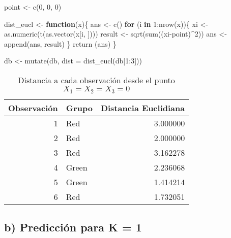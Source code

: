 \documentclass[
  12pt,
  letterpaper,
]{article}
\newenvironment{Shaded}{\begin{snugshade}}{\end{snugshade}}
\newcommand{\AttributeTok}[1]{\textcolor[rgb]{0.77,0.63,0.00}{#1}}
\newcommand{\ControlFlowTok}[1]{\textcolor[rgb]{0.13,0.29,0.53}{\textbf{#1}}}
\newcommand{\DecValTok}[1]{\textcolor[rgb]{0.00,0.00,0.81}{#1}}
\newcommand{\FunctionTok}[1]{\textcolor[rgb]{0.00,0.00,0.00}{#1}}
\newcommand{\NormalTok}[1]{#1}
\newcommand{\OtherTok}[1]{\textcolor[rgb]{0.56,0.35,0.01}{#1}}
\newcommand{\SpecialCharTok}[1]{\textcolor[rgb]{0.00,0.00,0.00}{#1}}
\begin{document}
\begin{Shaded}
\begin{Highlighting}[]
\NormalTok{point }\OtherTok{\textless{}{-}} \FunctionTok{c}\NormalTok{(}\DecValTok{0}\NormalTok{, }\DecValTok{0}\NormalTok{, }\DecValTok{0}\NormalTok{)}

\NormalTok{dist\_eucl }\OtherTok{\textless{}{-}} \ControlFlowTok{function}\NormalTok{(x)\{}
\NormalTok{  ans }\OtherTok{\textless{}{-}} \FunctionTok{c}\NormalTok{()}
  \ControlFlowTok{for}\NormalTok{ (i }\ControlFlowTok{in} \DecValTok{1}\SpecialCharTok{:}\FunctionTok{nrow}\NormalTok{(x))\{}
\NormalTok{    xi }\OtherTok{\textless{}{-}} \FunctionTok{as.numeric}\NormalTok{(}\FunctionTok{t}\NormalTok{(}\FunctionTok{as.vector}\NormalTok{(x[i, ])))}
\NormalTok{    result }\OtherTok{\textless{}{-}} \FunctionTok{sqrt}\NormalTok{(}\FunctionTok{sum}\NormalTok{((xi}\SpecialCharTok{{-}}\NormalTok{point)}\SpecialCharTok{\^{}}\DecValTok{2}\NormalTok{))}
\NormalTok{    ans }\OtherTok{\textless{}{-}} \FunctionTok{append}\NormalTok{(ans, result)}
\NormalTok{  \}}
  \FunctionTok{return}\NormalTok{ (ans)}
\NormalTok{\}}

\NormalTok{db }\OtherTok{\textless{}{-}} \FunctionTok{mutate}\NormalTok{(db, }\AttributeTok{dist =} \FunctionTok{dist\_eucl}\NormalTok{(db[}\DecValTok{1}\SpecialCharTok{:}\DecValTok{3}\NormalTok{]))}
\end{Highlighting}
\end{Shaded}

\begin{table}[H]

\caption{\label{tab:unnamed-chunk-11}Distancia a cada observación desde el punto $X_1 = X_2 = X_3 = 0$}
\centering
\begin{tabular}[t]{r|l|r}
\hline
Observación & Grupo & Distancia Euclidiana\\
\hline
1 & Red & 3.000000\\
\hline
2 & Red & 2.000000\\
\hline
3 & Red & 3.162278\\
\hline
4 & Green & 2.236068\\
\hline
5 & Green & 1.414214\\
\hline
6 & Red & 1.732051\\
\hline
\end{tabular}
\end{table}

\subsection{b) Predicción para K = 1}
\end{document}
